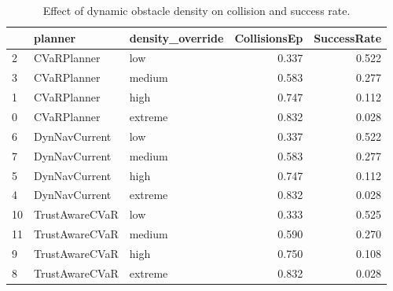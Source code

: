 \begin{table}
\caption{Effect of dynamic obstacle density on collision and success rate.}
\label{tab:density}
\begin{tabular}{lllrr}
\toprule
 & planner & density\_override & CollisionsEp & SuccessRate \\
\midrule
2 & CVaRPlanner & low & 0.337 & 0.522 \\
3 & CVaRPlanner & medium & 0.583 & 0.277 \\
1 & CVaRPlanner & high & 0.747 & 0.112 \\
0 & CVaRPlanner & extreme & 0.832 & 0.028 \\
6 & DynNavCurrent & low & 0.337 & 0.522 \\
7 & DynNavCurrent & medium & 0.583 & 0.277 \\
5 & DynNavCurrent & high & 0.747 & 0.112 \\
4 & DynNavCurrent & extreme & 0.832 & 0.028 \\
10 & TrustAwareCVaR & low & 0.333 & 0.525 \\
11 & TrustAwareCVaR & medium & 0.590 & 0.270 \\
9 & TrustAwareCVaR & high & 0.750 & 0.108 \\
8 & TrustAwareCVaR & extreme & 0.832 & 0.028 \\
\bottomrule
\end{tabular}
\end{table}
